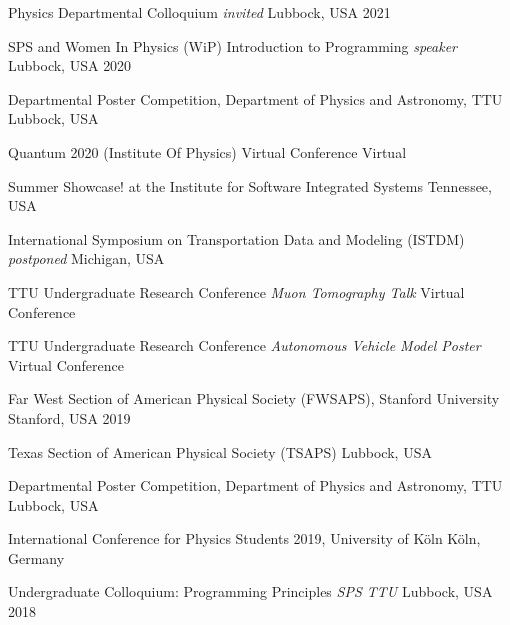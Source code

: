
\begin{cvhonors}

    \cvhonor
    {Physics Departmental Colloquium}
    {\textit{\scriptsize invited}}
    {Lubbock, USA}
    {2021}

    \cvhonor
    {SPS and Women In Physics (WiP) Introduction to Programming}
    {\textit{\scriptsize speaker}}
    {Lubbock, USA}
    {2020}


    \cvhonor
    {Departmental Poster Competition, Department of Physics and Astronomy, TTU}
    {}
    {Lubbock, USA}
    {}


    \cvhonor
    {Quantum 2020 (Institute Of Physics) Virtual Conference}
    {}
    {Virtual}
    {}

    
    \cvhonor
    {Summer Showcase! at the Institute for Software Integrated Systems}
    {}
    {Tennessee, USA}
    {}

    \cvhonor
    { International Symposium on Transportation Data and Modeling (ISTDM)}
    {\textit{\scriptsize postponed}}
    {Michigan, USA}
    {}

    \cvhonor
    {TTU Undergraduate Research Conference}
    {\textit{\scriptsize Muon Tomography Talk}}
    {Virtual Conference}
    {}

    \cvhonor
    {TTU Undergraduate Research Conference}
    {\textit{\scriptsize Autonomous Vehicle Model Poster}}
    {Virtual Conference}
    {}

    \cvhonor
    {Far West Section of American Physical Society (FWSAPS), Stanford University}
    {}
    {Stanford, USA}
    {2019}

    \cvhonor
    {Texas Section of American Physical Society (TSAPS)}
    {}
    {Lubbock, USA}
    {}

    \cvhonor
    {Departmental Poster Competition, Department of Physics and Astronomy, TTU}
    {}
    {Lubbock, USA}
    {}

    \cvhonor
    {International Conference for Physics Students 2019, University of Köln}
    {}
    {Köln, Germany}
    {}

    \cvhonor
    {Undergraduate Colloquium: Programming Principles}
    {\textit{\scriptsize SPS TTU}}
    {Lubbock, USA}
    {2018}

\end{cvhonors}
